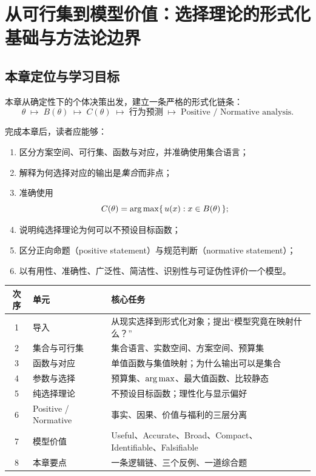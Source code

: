 



\chapter{从可行集到模型价值：选择理论的形式化基础与方法论边界}
\vspace{0.5cm}

\section*{本章定位与学习目标}

本章从确定性下的个体决策出发，建立一条严格的形式化链条：
\[
\theta \;\longmapsto\; B(\theta) \;\longmapsto\; C(\theta)
\;\longmapsto\; \text{行为预测} \;\longmapsto\; \text{Positive / Normative analysis}.
\]

完成本章后，读者应能够：
\begin{enumerate}
  \item 区分方案空间、可行集、函数与对应，并准确使用集合语言；
  \item 解释为何选择对应的输出是\emph{集合}而非点；
  \item 准确使用
        \[
          C(\theta)=\operatorname*{arg\,max}\{\,u(x):x\in B(\theta)\,\};
        \]
  \item 说明纯选择理论为何可以不预设目标函数；
  \item 区分正向命题（positive statement）与规范判断（normative statement）；
  \item 以有用性、准确性、广泛性、简洁性、识别性与可证伪性评价一个模型。
\end{enumerate}


\begin{center}
\begin{tabular}{clp{6.5cm}}
\toprule
次序 & 单元 & 核心任务 \\
\midrule
1 & 导入 & 从现实选择到形式化对象；提出“模型究竟在映射什么？” \\
2 & 集合与可行集 & 集合语言、实数空间、方案空间、预算集 \\
3 & 函数与对应 & 单值函数与集值映射；为什么输出可以是集合 \\
4 & 参数与选择 & 预算集、$\operatorname*{arg\,max}$、最大值函数、比较静态 \\
5 & 纯选择理论 & 不预设目标函数；理性化与显示偏好 \\
6 & Positive / Normative & 事实、因果、价值与福利的三层分离 \\
7 & 模型价值 & Useful、Accurate、Broad、Compact、Identifiable、Falsifiable \\
8 & 本章要点 & 一条逻辑链、三个反例、一道综合题 \\
\bottomrule
\end{tabular}
\end{center}

